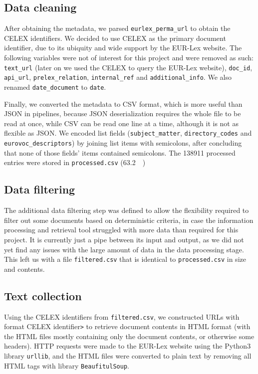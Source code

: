 \documentclass[sigconf, authorversion]{acmart}
\begin{document}
\subsection{Data cleaning}
\label{ssec:data-cleaning}

After obtaining the metadata, we parsed \texttt{eurlex\_perma\_url} to obtain the CELEX identifiers. We decided to use CELEX as the primary document identifier, due to its ubiquity and wide support by the EUR-Lex website.
The following variables were not of interest for this project and were removed as such: \texttt{text\_url} (later on we used the CELEX to query the EUR-Lex website), \texttt{doc\_id}, \texttt{api\_url}, \texttt{prelex\_relation}, \texttt{internal\_ref} and \texttt{additional\_info}. We also renamed \texttt{date\_document} to \texttt{date}.

Finally, we converted the metadata to CSV format, which is more useful than JSON in pipelines, because JSON deserialization requires the whole file to be read at once, while CSV can be read one line at a time, although it is not as flexible as JSON. We encoded list fields (\texttt{subject\_matter}, \texttt{directory\_codes} and \texttt{eurovoc\_descriptors}) by joining list items with semicolons, after concluding that none of those fields' items contained semicolons.
The 138911 processed entries were stored in \texttt{processed.csv} (\SI{63.2}{\mega\byte})

\subsection{Data filtering}

The additional data filtering step was defined to allow the flexibility required to filter out some documents based on deterministic criteria, in case the information processing and retrieval tool struggled with more data than required for this project. It is currently just a pipe between its input and output, as we did not yet find any issues with the large amount of data in the data processing stage. This left us with a file \texttt{filtered.csv} that is identical to \texttt{processed.csv} in size and contents.

\subsection{Text collection}

Using the CELEX identifiers from \texttt{filtered.csv}, we constructed URLs with format CELEX identifier\texttt{>} to retrieve document contents in HTML format (with the HTML files mostly containing only the document contents, or otherwise some headers). HTTP requests were made to the EUR-Lex website using the Python3 library \texttt{urllib}, and the HTML files were converted to plain text by removing all HTML tags with library \texttt{BeaufitulSoup}.
\end{document}
